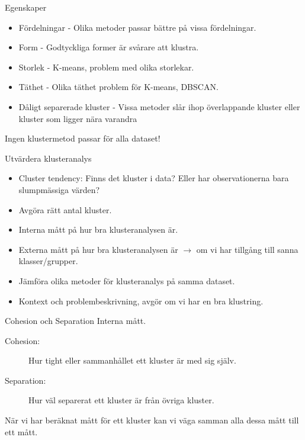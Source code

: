 \documentclass[10pt,english]{beamer}
\begin{document}
\begin{frame}{Egenskaper}
    
\begin{itemize}
    \item Fördelningar - Olika metoder passar bättre på vissa fördelningar.
    \item Form - Godtyckliga former är svårare att klustra.
    \item Storlek - K-means, problem med olika storlekar.
    \item Täthet - Olika täthet problem för K-means, DBSCAN.
    \item Dåligt separerade kluster - Vissa metoder slår ihop överlappande kluster eller kluster som ligger nära varandra
\end{itemize}

\begin{redbox}
Ingen klustermetod passar för alla dataset!
\end{redbox}

\end{frame}

\begin{frame}{Utvärdera klusteranalys}

    \begin{itemize}
        \item Cluster tendency: Finns det kluster i data? Eller har observationerna bara slumpmässiga värden?
        \item Avgöra rätt antal kluster.
        \item Interna mått på hur bra klusteranalysen är.
        \item Externa mått på hur bra klusteranalysen är $\rightarrow$ om vi har tillgång till sanna klasser/grupper.
        \item Jämföra olika metoder för klusteranalys på samma dataset.
        \item Kontext och problembeskrivning, avgör om vi har en bra klustring.
    \end{itemize}
    
\end{frame}

\begin{frame}{Cohesion och Separation}
    Interna mått.
    \begin{description}
        \item[Cohesion:] Hur tight eller sammanhållet ett kluster är med sig själv.
        \item[Separation:] Hur väl separerat ett kluster är från övriga kluster.
    \end{description}
    
    När vi har beräknat mått för ett kluster kan vi väga samman alla dessa mått till ett mått.

\end{frame}
\end{document}
